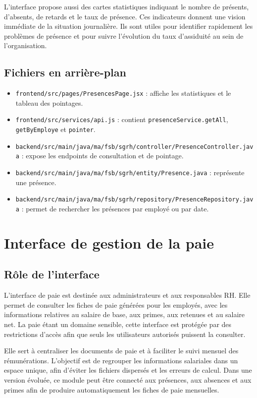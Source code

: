 \documentclass[12pt,a4paper]{report}
\begin{document}
L'interface propose aussi des cartes statistiques indiquant le nombre de présents, d'absents, de retards et le taux de présence. Ces indicateurs donnent une vision immédiate de la situation journalière. Ils sont utiles pour identifier rapidement les problèmes de présence et pour suivre l'évolution du taux d'assiduité au sein de l'organisation.

\subsection{Fichiers en arrière-plan}

\begin{itemize}
    \item \texttt{frontend/src/pages/PresencesPage.jsx} : affiche les statistiques et le tableau des pointages.
    \item \texttt{frontend/src/services/api.js} : contient \texttt{presenceService.getAll}, \texttt{getByEmploye} et \texttt{pointer}.
    \item \texttt{backend/src/main/java/ma/fsb/sgrh/controller/PresenceController.java} : expose les endpoints de consultation et de pointage.
    \item \texttt{backend/src/main/java/ma/fsb/sgrh/entity/Presence.java} : représente une présence.
    \item \texttt{backend/src/main/java/ma/fsb/sgrh/repository/PresenceRepository.java} : permet de rechercher les présences par employé ou par date.
\end{itemize}

\section{Interface de gestion de la paie}

\subsection{Rôle de l'interface}

L'interface de paie est destinée aux administrateurs et aux responsables RH. Elle permet de consulter les fiches de paie générées pour les employés, avec les informations relatives au salaire de base, aux primes, aux retenues et au salaire net. La paie étant un domaine sensible, cette interface est protégée par des restrictions d'accès afin que seuls les utilisateurs autorisés puissent la consulter.

Elle sert à centraliser les documents de paie et à faciliter le suivi mensuel des rémunérations. L'objectif est de regrouper les informations salariales dans un espace unique, afin d'éviter les fichiers dispersés et les erreurs de calcul. Dans une version évoluée, ce module peut être connecté aux présences, aux absences et aux primes afin de produire automatiquement les fiches de paie mensuelles.
\end{document}
